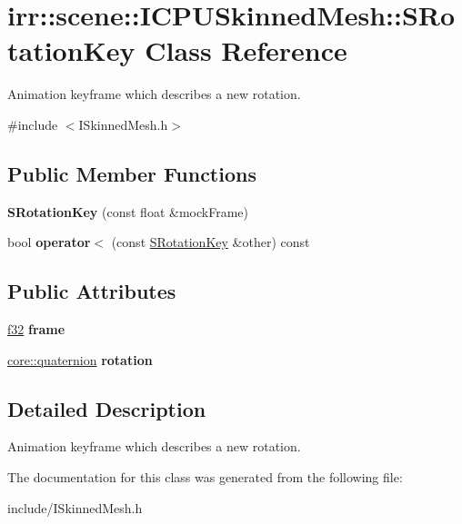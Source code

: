 \hypertarget{classirr_1_1scene_1_1ICPUSkinnedMesh_1_1SRotationKey}{}\section{irr\+:\+:scene\+:\+:I\+C\+P\+U\+Skinned\+Mesh\+:\+:S\+Rotation\+Key Class Reference}
\label{classirr_1_1scene_1_1ICPUSkinnedMesh_1_1SRotationKey}


Animation keyframe which describes a new rotation.  




{\ttfamily \#include $<$I\+Skinned\+Mesh.\+h$>$}

\subsection*{Public Member Functions}
\begin{DoxyCompactItemize}
\item 
{\bfseries S\+Rotation\+Key} (const float \&mock\+Frame)\hypertarget{classirr_1_1scene_1_1ICPUSkinnedMesh_1_1SRotationKey_af635eb43999eaea058f5f609c0efae3b}{}\label{classirr_1_1scene_1_1ICPUSkinnedMesh_1_1SRotationKey_af635eb43999eaea058f5f609c0efae3b}

\item 
bool {\bfseries operator$<$} (const \hyperlink{classirr_1_1scene_1_1ICPUSkinnedMesh_1_1SRotationKey}{S\+Rotation\+Key} \&other) const \hypertarget{classirr_1_1scene_1_1ICPUSkinnedMesh_1_1SRotationKey_aaacdbdb20230c75b851e1057a4635e15}{}\label{classirr_1_1scene_1_1ICPUSkinnedMesh_1_1SRotationKey_aaacdbdb20230c75b851e1057a4635e15}

\end{DoxyCompactItemize}
\subsection*{Public Attributes}
\begin{DoxyCompactItemize}
\item 
\hyperlink{namespaceirr_a0277be98d67dc26ff93b1a6a1d086b07}{f32} {\bfseries frame}\hypertarget{classirr_1_1scene_1_1ICPUSkinnedMesh_1_1SRotationKey_a588e7c7e0368540a1127be08ed97c760}{}\label{classirr_1_1scene_1_1ICPUSkinnedMesh_1_1SRotationKey_a588e7c7e0368540a1127be08ed97c760}

\item 
\hyperlink{classirr_1_1core_1_1quaternion}{core\+::quaternion} {\bfseries rotation}\hypertarget{classirr_1_1scene_1_1ICPUSkinnedMesh_1_1SRotationKey_a967dfd931772e12f3b045da0c47bf05c}{}\label{classirr_1_1scene_1_1ICPUSkinnedMesh_1_1SRotationKey_a967dfd931772e12f3b045da0c47bf05c}

\end{DoxyCompactItemize}


\subsection{Detailed Description}
Animation keyframe which describes a new rotation. 

The documentation for this class was generated from the following file\+:\begin{DoxyCompactItemize}
\item 
include/I\+Skinned\+Mesh.\+h\end{DoxyCompactItemize}
